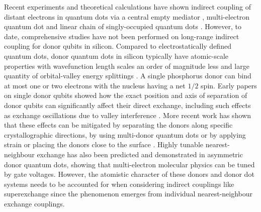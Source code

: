 \documentclass[%
showkeys,
 amsmath,amssymb,
 aps,
prb,
]{revtex4-2}
\begin{document}
Recent experiments and theoretical calculations have shown indirect coupling of distant electrons in quantum dots via a central empty mediator \cite{chan_exchange_2021,deng_interplay_2020, rancic_ultracoherent_2017, baart_coherent_2017,mehl_two-qubit_2014}, multi-electron quantum dot \cite{deng_interplay_2020,mehl_two-qubit_2014, malinowski_fast_2019,malinowski_spin_2018,deng_negative_2018,croot_device_2018,srinivasa_tunable_2015} and linear chain of singly-occupied quantum dots \cite{chan_exchange_2021,qiao_long-distance_2021,fei_mediated_2012}. However, to date, comprehensive studies have not been performed on long-range indirect coupling for donor qubits in silicon. Compared to electrostatically defined quantum dots, donor quantum dots in silicon typically have atomic-scale properties with wavefunction length scales an order of magnitude less and large quantity of orbital-valley energy splittings \cite{ramdas_spectroscopy_1981}. A single phosphorus donor can bind at most one or two electrons with the nucleus having a net $1/2$ spin. Early papers on single donor qubits showed how the exact position and axis of separation of donor qubits can significantly affect their direct exchange, including such effects as exchange oscillations due to valley interference \cite{tankasalaShallowDopantPairs2022b, voisinValleyInterferenceSpin2020}. More recent work has shown that these effects can be mitigated by separating the donors along specific crystallographic directions, by using multi-donor quantum dots \cite{wangHighlyTunableExchange2016a} or by applying strain or placing the donors close to the surface \cite{tankasalaShallowDopantPairs2022b}. Highly tunable nearest-neighbour exchange has also been predicted \cite{wangHighlyTunableExchange2016a} and demonstrated \cite{heTwoqubitGatePhosphorus2019} in asymmetric donor quantum dots, showing that multi-electron molecular physics can be tuned by gate voltages. However, the atomistic character of these donors and donor dot systems needs to be accounted for when considering indirect couplings like superexchange since the phenomenon emerges from individual nearest-neighbour exchange couplings.
\end{document}
